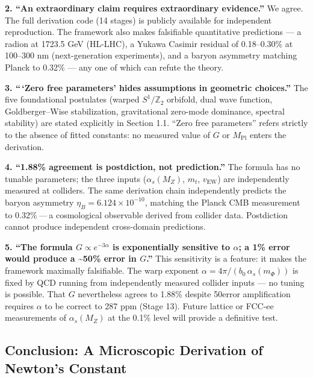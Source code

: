 \documentclass[
  11pt,
]{article}
\begin{document}
\textbf{2. ``An extraordinary claim requires extraordinary evidence.''}
We agree. The full derivation code (14 stages) is publicly available for
independent reproduction. The framework also makes falsifiable
quantitative predictions --- a radion at 1723.5 GeV (HL-LHC), a Yukawa
Casimir residual of 0.18--0.30\% at 100--300 nm (next-generation
experiments), and a baryon asymmetry matching Planck to 0.32\% --- any
one of which can refute the theory.

\textbf{3. ``\,`Zero free parameters' hides assumptions in geometric
choices.''} The five foundational postulates (warped
\(S^1/\mathbb{Z}_2\) orbifold, dual wave function, Goldberger--Wise
stabilization, gravitational zero-mode dominance, spectral stability)
are stated explicitly in Section 1.1. ``Zero free parameters'' refers
strictly to the absence of fitted constants: no measured value of \(G\)
or \(M_{\text{Pl}}\) enters the derivation.

\textbf{4. ``1.88\% agreement is postdiction, not prediction.''} The
formula has no tunable parameters; the three inputs (\(\alpha_s(M_Z)\),
\(m_t\), \(v_{\text{EW}}\)) are independently measured at colliders. The
same derivation chain independently predicts the baryon asymmetry
\(\eta_B = 6.124 \times 10^{-10}\), matching the Planck CMB measurement
to 0.32\% --- a cosmological observable derived from collider data.
Postdiction cannot produce independent cross-domain predictions.

\textbf{5. ``The formula \(G \propto e^{-3\alpha}\) is exponentially
sensitive to \(\alpha\); a 1\% error would produce a \textasciitilde50\%
error in \(G\).''} This sensitivity is a feature: it makes the framework
maximally falsifiable. The warp exponent
\(\alpha = 4\pi/(b_0\,\alpha_s(m_\Phi))\) is fixed by QCD running from
independently measured collider inputs --- no tuning is possible. That
\(G\) nevertheless agrees to 1.88\% despite 50\times error amplification
requires \(\alpha\) to be correct to 287 ppm (Stage 13). Future lattice
or FCC-ee measurements of \(\alpha_s(M_Z)\) at the 0.1\% level will
provide a definitive test.

\bigskip

\hypertarget{conclusion-a-microscopic-derivation-of-newtons-constant}{%
\subsection{Conclusion: A Microscopic Derivation of Newton's
Constant}\label{conclusion-a-microscopic-derivation-of-newtons-constant}}
\end{document}
